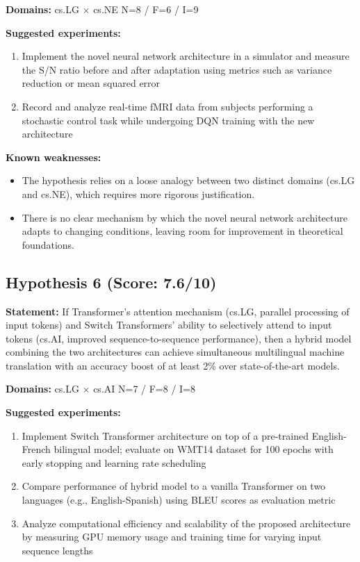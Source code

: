 \documentclass[12pt,a4paper]{article}
\begin{document}
\noindent\textbf{Domains:} cs.LG $\times$ cs.NE
\hspace{1em} N=8 / F=6 / I=9

\textbf{Suggested experiments:}
\begin{enumerate}
  \item Implement the novel neural network architecture in a simulator and measure the S/N ratio before and after adaptation using metrics such as variance reduction or mean squared error
  \item Record and analyze real-time fMRI data from subjects performing a stochastic control task while undergoing DQN training with the new architecture
\end{enumerate}

\textbf{Known weaknesses:}
\begin{itemize}
  \item The hypothesis relies on a loose analogy between two distinct domains (cs.LG and cs.NE), which requires more rigorous justification.
  \item There is no clear mechanism by which the novel neural network architecture adapts to changing conditions, leaving room for improvement in theoretical foundations.
\end{itemize}
\subsection*{Hypothesis 6 (Score: 7.6/10)}

\textbf{Statement:} If Transformer's attention mechanism (cs.LG, parallel processing of input tokens) and Switch Transformers' ability to selectively attend to input tokens (cs.AI, improved sequence-to-sequence performance), then a hybrid model combining the two architectures can achieve simultaneous multilingual machine translation with an accuracy boost of at least 2\% over state-of-the-art models.

\noindent\textbf{Domains:} cs.LG $\times$ cs.AI
\hspace{1em} N=7 / F=8 / I=8

\textbf{Suggested experiments:}
\begin{enumerate}
  \item Implement Switch Transformer architecture on top of a pre-trained English-French bilingual model; evaluate on WMT14 dataset for 100 epochs with early stopping and learning rate scheduling
  \item Compare performance of hybrid model to a vanilla Transformer on two languages (e.g., English-Spanish) using BLEU scores as evaluation metric
  \item Analyze computational efficiency and scalability of the proposed architecture by measuring GPU memory usage and training time for varying input sequence lengths
\end{enumerate}
\end{document}

